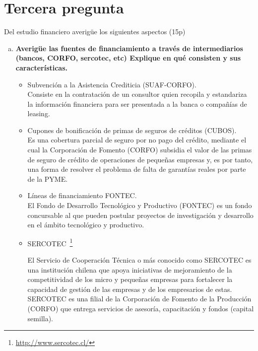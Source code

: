 \section{Tercera pregunta}

Del estudio financiero averigüe los siguientes aspectos (15p)

\begin{enumerate}[(a)]
    \item {\bf Averigüe las fuentes de financiamiento a través de intermediarios
          (bancos, CORFO, sercotec, etc) Explique en qué consisten y sus características.}\\


        \begin{itemize}
               \item Subvención a la Asistencia Crediticia (SUAF-CORFO).\\

                    Consiste en la contratación de un consultor quien recopila y estandariza
                    la información financiera para ser presentada a la banca o compañías de leasing.

                \item Cupones de bonificación de primas de seguros de créditos (CUBOS).\\

                    Es una cobertura parcial de seguro por no pago del crédito, mediante el cual la Corporación
                    de Fomento (CORFO) subsidia el valor de las primas de seguro de crédito de operaciones de
                    pequeñas empresas y, es por tanto, una forma de resolver el problema de falta de garantías
                    reales por parte de la PYME.

                \item Líneas de financiamiento FONTEC.\\

                    El Fondo de Desarrollo Tecnológico y Productivo (FONTEC) es un fondo concursable al
                    que pueden postular proyectos de investigación y desarrollo en el ámbito tecnológico y
                    productivo.

                \item SERCOTEC~\footnote{\url{http://www.sercotec.cl/}}

                    El Servicio de Cooperación Técnica o más conocido como SERCOTEC es una institución chilena que apoya
                    iniciativas de mejoramiento de la competitividad de los micro y pequeñas empresas para fortalecer
                    la capacidad de gestión de las empresas y de los empresarios de estas. SERCOTEC es una filial de la Corporación de Fomento de la Producción (CORFO)
                   que entrega servicios de asesoría, capacitación y fondos (capital semilla). 



\end{itemize}
\end{enumerate}

